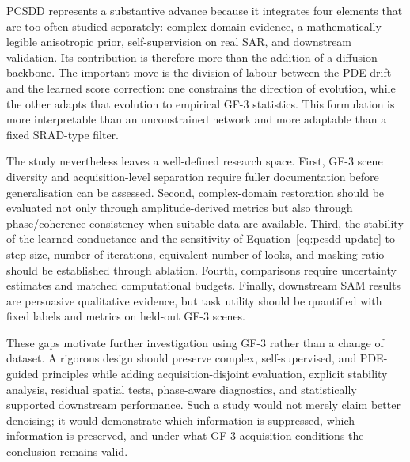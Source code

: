 \documentclass[11pt]{article}
\begin{document}
PCSDD represents a substantive advance because it integrates four elements that are too often studied separately: complex-domain evidence, a mathematically legible anisotropic prior, self-supervision on real SAR, and downstream validation. Its contribution is therefore more than the addition of a diffusion backbone. The important move is the division of labour between the PDE drift and the learned score correction: one constrains the direction of evolution, while the other adapts that evolution to empirical GF-3 statistics. This formulation is more interpretable than an unconstrained network and more adaptable than a fixed SRAD-type filter.

The study nevertheless leaves a well-defined research space. First, GF-3 scene diversity and acquisition-level separation require fuller documentation before generalisation can be assessed. Second, complex-domain restoration should be evaluated not only through amplitude-derived metrics but also through phase/coherence consistency when suitable data are available. Third, the stability of the learned conductance and the sensitivity of Equation~\eqref{eq:pcsdd-update} to step size, number of iterations, equivalent number of looks, and masking ratio should be established through ablation. Fourth, comparisons require uncertainty estimates and matched computational budgets. Finally, downstream SAM results are persuasive qualitative evidence, but task utility should be quantified with fixed labels and metrics on held-out GF-3 scenes.

These gaps motivate further investigation using GF-3 rather than a change of dataset. A rigorous design should preserve complex, self-supervised, and PDE-guided principles while adding acquisition-disjoint evaluation, explicit stability analysis, residual spatial tests, phase-aware diagnostics, and statistically supported downstream performance. Such a study would not merely claim better denoising; it would demonstrate which information is suppressed, which information is preserved, and under what GF-3 acquisition conditions the conclusion remains valid.



\end{document}
